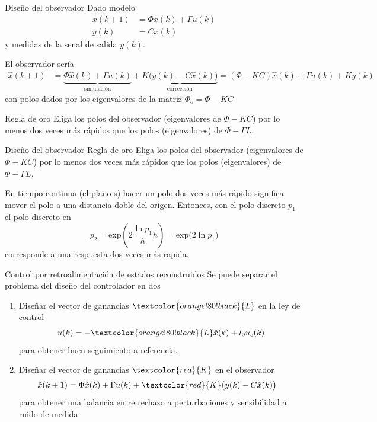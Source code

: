 \documentclass[presentation,aspectratio=1610]{beamer}
\begin{document}
\begin{frame}[label={sec:org13f2b17}]{Diseño del observador}
Dado modelo
 \begin{equation*}
 \begin{split}
  x(k+1) &= \Phi x(k) + \Gamma u(k)\\
  y(k) &= C x(k)
 \end{split}
 \label{eq:ssmodel}
\end{equation*}
y medidas de la senal de salida \(y(k)\). 

El observador sería 
\begin{equation*}
\begin{split}
\hat{x}(k+1) &= \underbrace{\Phi \hat{x}(k) + \Gamma u(k)}_{\text{simulación}} + \underbrace{K\big(y(k) - C\hat{x}(k)\big)}_{\text{corrección}} = \left(\Phi - KC\right)\hat{x}(k) +  \Gamma u(k) + Ky(k)
\end{split}
\end{equation*}
con polos dados por los eigenvalores de la matriz \(\Phi_o = \Phi - KC\)

\alert{Regla de oro} Eliga los polos del observador (eigenvalores de \(\Phi-KC\)) por lo menos dos veces más rápidos que los polos (eigenvalores) de \(\Phi-\Gamma L\).
\end{frame}

\begin{frame}[label={sec:org879dcc9}]{Diseño del observador}
\alert{Regla de oro} Eliga los polos del observador (eigenvalores de \(\Phi-KC\)) por lo menos dos veces más rápidos que los polos (eigenvalores) de \(\Phi-\Gamma L\).

En tiempo continua (el plano s) hacer un polo dos veces más rápido significa mover el polo a una distancia doble del origen. Entonces, con el polo discreto \(p_1\) el polo discreto en 
\[ p_2 = \text{exp}\left( 2 \frac{\ln p_1}{h} h\right) = \text{exp} \big( 2 \ln p_1 \big)\]
corresponde a una respuesta dos veces más rapida.
\end{frame}

\begin{frame}[label={sec:orgc512225}]{Control por retroalimentación de estados reconstruidos}
Se puede separar el problema del diseño del controlador en dos
\begin{enumerate}
\item Diseñar el vector de ganancias \(\textcolor{orange!80!black}{L}\) en la ley de control
\[ u(k) = -\textcolor{orange!80!black}{L} \hat{x}(k) + l_0 u_c(k)\]
para obtener buen seguimiento a referencia.
\item Diseñar el vector de ganancias \(\textcolor{red}{K}\) en el observador 
\begin{equation*}
\begin{split}
\hat{x}(k+1) &= \Phi \hat{x}(k) + \Gamma u(k) + \textcolor{red}{K} \big(y(k) - C\hat{x}(k)\big)
\end{split}
\end{equation*}
para obtener una balancia entre rechazo a perturbaciones y sensibilidad a ruido de medida.
\end{enumerate}
\end{frame}
\end{document}
